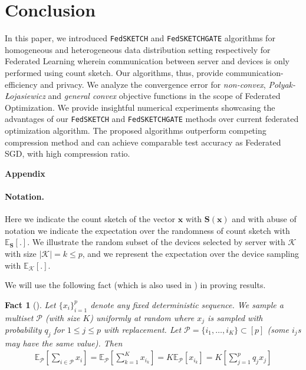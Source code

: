 \documentclass[twoside]{article}
\newcommand{\pl}{Polyak-\L{}ojasiewicz}
\newtheorem{fact}[theorem]{Fact}
\begin{document}
\vspace{-0.05in}
\section{Conclusion}
\vspace{-0.05in}

In this paper, we introduced \texttt{FedSKETCH} and \texttt{FedSKETCHGATE} algorithms for homogeneous and heterogeneous data distribution setting respectively for Federated Learning wherein communication between server and devices is only performed using count sketch. 
Our algorithms, thus, provide communication-efficiency and privacy. 
We analyze the convergence error for \emph{non-convex}, \emph{\pl} and \emph{general convex} objective functions in the scope of Federated Optimization.  
We provide insightful numerical experiments showcasing the advantages of our \texttt{FedSKETCH} and \texttt{FedSKETCHGATE} methods over current federated optimization algorithm. The proposed algorithms outperform competing compression method and can achieve comparable test accuracy as Federated SGD, with high compression ratio.


\clearpage


\newpage
\appendix
%

\onecolumn

\noindent\textbf{\LARGE Appendix}\\

\paragraph{Notation.} Here we indicate the count sketch of the vector $\boldsymbol{x}$ with $\mathbf{S}(\boldsymbol{x})$ and with abuse of notation we indicate the expectation over the randomness of count sketch with $\mathbb{E}_{\mathbf{S}}[.]$. We illustrate the random subset of the devices selected by server with $\mathcal{K}$ with size $|\mathcal{K}|=k\leq p$, and we represent the expectation over the device sampling with $\mathbb{E}_{\mathcal{K}}[.]$. 

We will use the following fact (which is also used in \cite{li2019convergence,haddadpour2019convergence}) in proving results.
\begin{fact}[\cite{li2019convergence,haddadpour2019convergence}]\label{fact:1}
Let
$\{x_i\}_{i=1}^p$ denote any fixed deterministic sequence. We sample a multiset $\mathcal{P}$ (with size $K$) uniformly at random where $x_j$ is sampled  with probability $q_j$ for $1\leq j\leq p$ with replacement.  Let $\mathcal{P} = \{i_1,\ldots, i_K\} \subset[p]$ (some $i_j$s may have the same value). Then
\begin{align}
    \mathbb{E}_{\mathcal{P}}\left[\sum_{i\in \mathcal{P}}x_i\right]=\mathbb{E}_{\mathcal{P}}\left[\sum_{k=1}^Kx_{i_k}\right]=K\mathbb{E}_{\mathcal{P}}\left[x_{i_k}\right]=K\left[\sum_{j=1}^pq_jx_j\right]
\end{align}
\end{fact}
\end{document}

